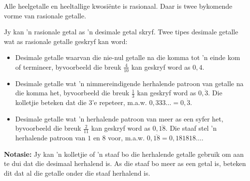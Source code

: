 Alle heelgetalle en heeltallige kwosiënte is rasionaal. Daar is twee bykomende vorme van rasionale getalle.\par 
% 
% 

Jy kan ’n rasionale getal as ’n desimale getal skryf. Twee tipes desimale getalle wat as rasionale getalle geskryf
kan word:\par 
\begin{itemize}
\item Desimale getalle waarvan die nie-nul getalle na die komma tot ’n einde kom of termineer, byvoorbeeld die breuk
 $\frac{4}{10}$ kan geskryf word as $0,4$.
\item Desimale getalle wat ’n nimmereindigende herhalende patroon van getalle na die komma het, byvoorbeeld die breuk $\frac{1}{3}$ kan geskryf word as
$0,\dot{3}$. 
Die kolletjie beteken dat die $3$’e repeteer, m.a.w. $0,333\ldots=0,\dot{3}$.
\item Desimale getalle wat 'n herhalende patroon van meer as een syfer het, byvoorbeeld die breuk $\frac{2}{11}$ kan geskryf word as 
$0,\overline{18}$. 
Die staaf stel 'n herhalende patroon van $1$ en $8$ voor, m.a.w.
$0,\overline{18} = 0,181818\ldots$.
\end{itemize}

\par
\textbf{Notasie:} Jy kan 'n kolletjie of 'n staaf bo die herhalende getalle gebruik om aan te dui dat die desimaal herhalend is. As die staaf bo meer as een getal is, beteken dit dat al die getalle onder die staaf herhalend is. 


